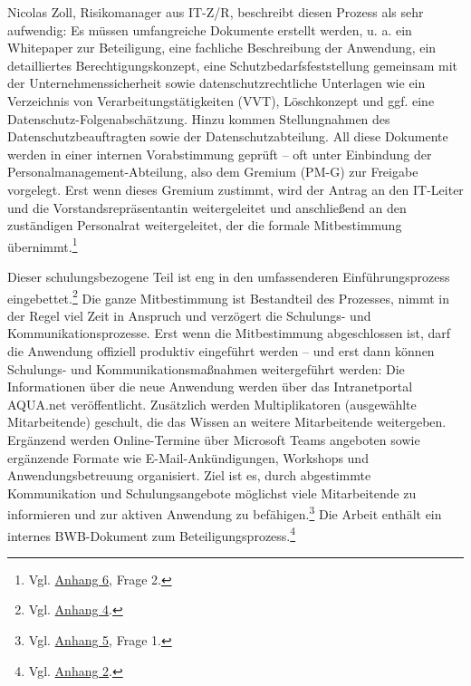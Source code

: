 \documentclass[
    12pt, 
    a4paper,
    ]{scrartcl} %
\begin{document}
Nicolas Zoll, Risikomanager aus IT-Z/R, beschreibt diesen Prozess als sehr aufwendig: Es müssen umfangreiche Dokumente erstellt werden, u. a. ein Whitepaper zur Beteiligung, eine fachliche Beschreibung der Anwendung, ein detailliertes Berechtigungskonzept, eine Schutzbedarfsfeststellung gemeinsam mit der Unternehmenssicherheit sowie datenschutzrechtliche Unterlagen wie ein Verzeichnis von Verarbeitungstätigkeiten (VVT), Löschkonzept und ggf. eine Datenschutz-Folgenabschätzung. Hinzu kommen Stellungnahmen des Datenschutzbeauftragten sowie der Datenschutzabteilung. All diese Dokumente werden in einer internen Vorabstimmung geprüft – oft unter Einbindung der Personalmanagement-Abteilung, also dem Gremium (PM-G) zur Freigabe vorgelegt. Erst wenn dieses Gremium zustimmt, wird der Antrag an den IT-Leiter und die Vorstandsrepräsentantin weitergeleitet und anschließend an den zuständigen Personalrat weitergeleitet, der die formale Mitbestimmung übernimmt.\footnote{Vgl. \hyperref[sec:Anhang6]{Anhang 6}, Frage 2.}

Dieser schulungsbezogene Teil ist eng in den umfassenderen Einführungsprozess eingebettet.\footnote{Vgl. \hyperref[sec:Anhang4]{Anhang 4}.} Die ganze Mitbestimmung ist Bestandteil des Prozesses, nimmt in der Regel viel Zeit in Anspruch und verzögert die Schulungs- und Kommunikationsprozesse. Erst wenn die Mitbestimmung abgeschlossen ist, darf die Anwendung offiziell produktiv eingeführt werden – und erst dann können Schulungs- und Kommunikationsmaßnahmen weitergeführt werden: Die Informationen über die neue Anwendung werden über das Intranetportal AQUA.net veröffentlicht. Zusätzlich werden Multiplikatoren (ausgewählte Mitarbeitende) geschult, die das Wissen an weitere Mitarbeitende weitergeben. Ergänzend werden Online-Termine über Microsoft Teams angeboten sowie ergänzende Formate wie E-Mail-Ankündigungen, Workshops und Anwendungsbetreuung organisiert. Ziel ist es, durch abgestimmte Kommunikation und Schulungsangebote möglichst viele Mitarbeitende zu informieren und zur aktiven Anwendung zu befähigen.\footnote{Vgl. \hyperref[sec:Anhang 5]{Anhang 5}, Frage 1.} Die Arbeit enthält ein internes BWB-Dokument zum Beteiligungsprozess.\footnote{Vgl. \hyperref[sec:Anhang2]{Anhang 2}.}
\end{document}
